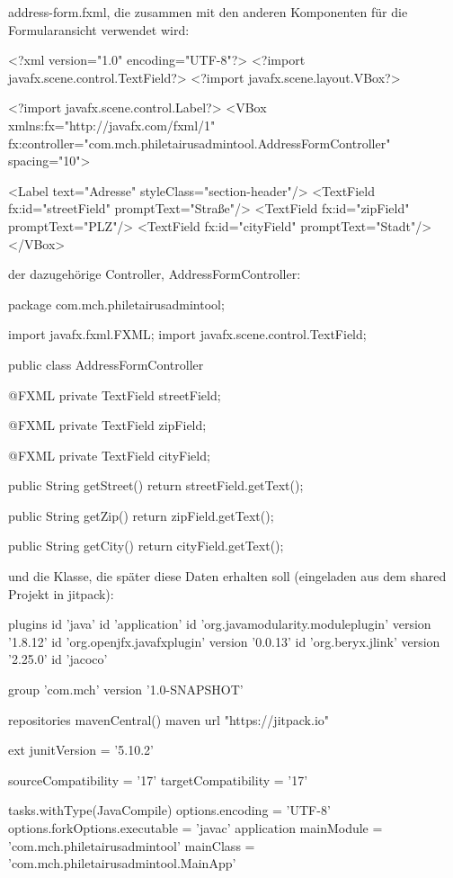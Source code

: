 address-form.fxml, die zusammen mit den anderen Komponenten für die Formularansicht verwendet wird:

<?xml version="1.0" encoding="UTF-8"?>
<?import javafx.scene.control.TextField?>
<?import javafx.scene.layout.VBox?>

<?import javafx.scene.control.Label?>
<VBox xmlns:fx="http://javafx.com/fxml/1" fx:controller="com.mch.philetairusadmintool.AddressFormController" spacing="10">

    <Label text="Adresse" styleClass="section-header"/>
    <TextField fx:id="streetField" promptText="Straße"/>
    <TextField fx:id="zipField" promptText="PLZ"/>
    <TextField fx:id="cityField" promptText="Stadt"/>
</VBox>


der dazugehörige Controller, AddressFormController:

package com.mch.philetairusadmintool;

import javafx.fxml.FXML;
import javafx.scene.control.TextField;

public class AddressFormController {

    @FXML
    private TextField streetField;

    @FXML
    private TextField zipField;

    @FXML
    private TextField cityField;

    public String getStreet() {
        return streetField.getText();
    }

    public String getZip() {
        return zipField.getText();
    }

    public String getCity() {
        return cityField.getText();
    }
}

und die Klasse, die später diese Daten erhalten soll (eingeladen aus dem shared Projekt in jitpack):

plugins {
  id 'java'
  id 'application'
  id 'org.javamodularity.moduleplugin' version '1.8.12'
  id 'org.openjfx.javafxplugin' version '0.0.13'
  id 'org.beryx.jlink' version '2.25.0'
  id 'jacoco'
}

group 'com.mch'
version '1.0-SNAPSHOT'

repositories {
  mavenCentral()
  maven { url "https://jitpack.io" }
}

ext {
  junitVersion = '5.10.2'
}

sourceCompatibility = '17'
targetCompatibility = '17'

tasks.withType(JavaCompile) {
  options.encoding = 'UTF-8'
  options.forkOptions.executable = 'javac'
}
application {
  mainModule = 'com.mch.philetairusadmintool'
  mainClass = 'com.mch.philetairusadmintool.MainApp'
}

